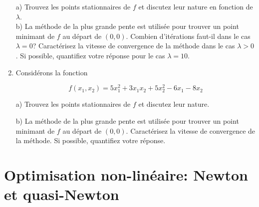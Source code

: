\begin{enumerate}
    a) Trouvez les points stationnaires de $f$ et discutez leur nature en fonction de $\lambda$.\\

    b) La méthode de la plus grande pente est utilisée pour trouver un point minimant de $f$ au départ de $(0, 0)$.
    Combien d'itérations faut-il dans le cas $\lambda = 0$? Caractérisez la vitesse de convergence de la
    méthode dans le cas $\lambda >0$. Si possible, quantifiez votre réponse pour le cas  $\lambda =10$.

    \begin{solution}
    \end{solution}

  \item  Consid\'erons la fonction

    $$f(x_1,x_2) = 5 x_1^2 + 3 x_1 x_2 + 5 x_2^2 - 6 x_1 -8 x_2$$




    a) Trouvez les points stationnaires de $f$ et discutez leur nature.

    b) La m\'ethode de la plus grande pente est utilis\'ee pour trouver un point
    minimant de $f$ au d\'epart de $(0, 0)$.
    Caract\'erisez la vitesse de convergence de la
    m\'ethode. Si possible, quantifiez votre r\'eponse.



\end{enumerate}





\newpage


\section{Optimisation non-linéaire: Newton et quasi-Newton}

